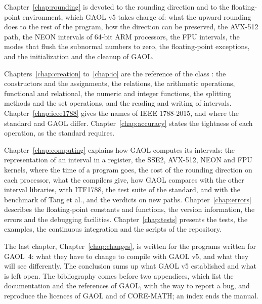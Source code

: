 \medskip
Chapter~\ref{chap:rounding} is devoted to the rounding direction and to the
floating-point environment, which GAOL v5 takes charge of: what the upward
rounding does to the rest of the program, how the direction can be
preserved, the AVX-512 path, the NEON intervals of 64-bit ARM processors, the
FPU intervals, the modes that flush the subnormal numbers to zero, the
floating-point exceptions, and the initialization and the cleanup of GAOL.

\medskip
Chapters~\ref{chap:creation} to~\ref{chap:io} are the reference of the class
: the constructors and the assignments, the relations, the
arithmetic operations, functional and relational, the numeric and integer
functions, the splitting methods and the set operations, and the reading and
writing of intervals. Chapter~\ref{chap:ieee1788} gives the names of IEEE
1788-2015, and where the standard and GAOL differ. Chapter~\ref{chap:accuracy}
states the tightness of each operation, as the standard requires.

\medskip
Chapter~\ref{chap:computing} explains how GAOL computes its intervals: the
representation of an interval in a register, the SSE2, AVX-512, NEON and FPU
kernels, where the time of a program goes, the cost of the rounding direction
on each processor, what the compilers give, how GAOL compares with the other
interval libraries, with ITF1788, the test suite of the standard, and with the
benchmark of Tang et al., and the verdicts
on new paths. Chapter~\ref{chap:errors} describes the floating-point constants
and functions, the version information, the errors and the debugging
facilities. Chapter~\ref{chap:tests} presents the tests, the examples, the
continuous integration and the scripts of the repository.

\medskip
The last chapter, Chapter~\ref{chap:changes}, is written for the programs
written for GAOL~4: what they have to change to compile with GAOL v5, and what they will
see differently. The conclusion sums up what GAOL v5 established and what is
left open. The bibliography comes before two appendices, which list the
documentation and the references of GAOL, with the way to report a bug, and
reproduce the licences of GAOL and of CORE-MATH; an index ends the manual.
